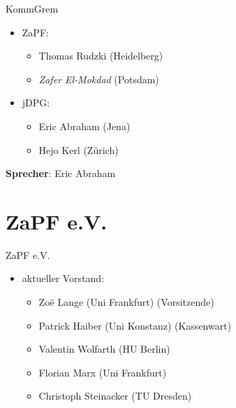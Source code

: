 \documentclass[compress, aspectratio=169]{beamer}
\begin{document}
\begin{frame}{KommGrem}
	\begin{itemize}
		\item[] ZaPF:
			\begin{itemize}
				\item Thomas Rudzki (Heidelberg)
				\item \emph{Zafer El-Mokdad} (Potsdam)
			\end{itemize}
		\item[] jDPG:
			\begin{itemize}
				\item Eric Abraham (Jena)
				\item Hejo Kerl (Zürich)
			\end{itemize}
	\end{itemize}
	\vspace{0.5cm}
	\textbf{Sprecher}: Eric Abraham
\end{frame}

\section{ZaPF e.V.}

\begin{frame}{ZaPF e.V.}
	\begin{itemize}
		\item[] aktueller Vorstand:
			\begin{itemize}
				\item Zo\"e Lange (Uni Frankfurt) (Vorsitzende)
				\item Patrick Haiber (Uni Konstanz) (Kassenwart)
				\item Valentin Wolfarth (HU Berlin) 
				\item Florian Marx (Uni Frankfurt)
				\item Christoph Steinacker (TU Dresden)
			\end{itemize}
	\end{itemize}
\end{frame} 
\end{document}
